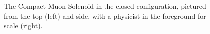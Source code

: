 \begin{figure}[htb]
    \centering
    \quad
    \caption[The Compact Muon Solenoid in the closed configuration, pictured from the top and side, with a physicist in the foreground for scale]{
        The Compact Muon Solenoid in the closed configuration, pictured from the top (left) and side, with a physicist in the foreground for scale (right). %
    }
    \label{fig:cms_jguiang}
\end{figure}

